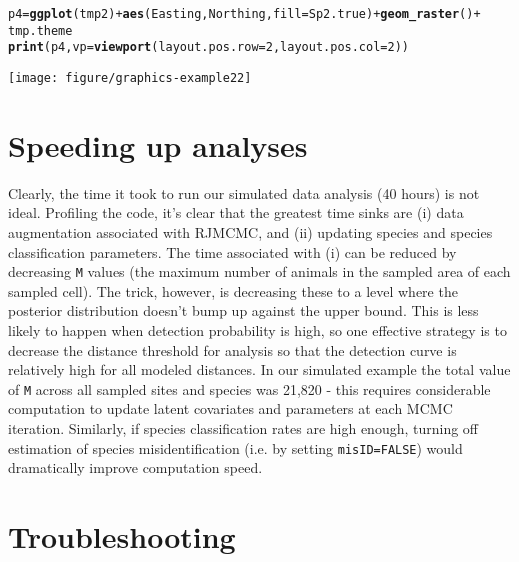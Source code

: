 \documentclass{article}\usepackage{graphicx, color}
\makeatletter
\def\maxwidth{ %
  \ifdim\Gin@nat@width>\linewidth
    \linewidth
  \else
    \Gin@nat@width
  \fi
}
\newcommand{\hlfunctioncall}[1]{\textcolor[rgb]{0.501960784313725,0,0.329411764705882}{\textbf{#1}}}%
\newenvironment{kframe}{%
 \def\at@end@of@kframe{}%
 \ifinner\ifhmode%
  \def\at@end@of@kframe{\end{minipage}}%
  \begin{minipage}{\columnwidth}%
 \fi\fi%
 \def\FrameCommand##1{\hskip\@totalleftmargin \hskip-\fboxsep
 \colorbox{shadecolor}{##1}\hskip-\fboxsep
     \hskip-\linewidth \hskip-\@totalleftmargin \hskip\columnwidth}%
 \MakeFramed {\advance\hsize-\width
   \@totalleftmargin\z@ \linewidth\hsize
   \@setminipage}}%
 {\par\unskip\endMakeFramed%
 \at@end@of@kframe}
\newenvironment{knitrout}{}{} %
\makeatother
\begin{document}
\begin{knitrout}
\begin{kframe}
{\ttfamily\noindent\bfseries\color{errorcolor}{\#\# Error: object 'Sp1.true' not found}}\begin{alltt}
p4 = \hlfunctioncall{ggplot}(tmp2) + \hlfunctioncall{aes}(Easting, Northing, fill = Sp2.true) + \hlfunctioncall{geom_raster}() + 
    tmp.theme
\hlfunctioncall{print}(p4, vp = \hlfunctioncall{viewport}(layout.pos.row = 2, layout.pos.col = 2))
\end{alltt}


{\ttfamily\noindent\bfseries\color{errorcolor}{\#\# Error: object 'Sp2.true' not found}}\end{kframe}

{\centering \texttt{[image: figure/graphics-example22]} 

}



\end{knitrout}



\section{Speeding up analyses}

Clearly, the time it took to run our simulated data analysis (40 hours) is not ideal.  Profiling the code,
it's clear that the greatest time sinks are (i) data augmentation associated with RJMCMC, and (ii) updating species and species classification parameters. The time
associated with (i) can be reduced by decreasing \texttt{M} values (the maximum number of animals in the sampled area of each sampled cell).  The trick, however, is decreasing these to a level where the posterior distribution doesn't bump up against the upper bound.  This is less likely to happen when detection probability is high, so one effective strategy is to decrease the distance threshold for analysis so that the detection curve is relatively high for all modeled distances.  In our simulated example the total value of \texttt{M} across all sampled sites and species was 21,820 - this requires considerable computation to update latent covariates and parameters at each MCMC iteration. Similarly, if species classification rates are high enough, turning off estimation of species misidentification (i.e. by setting \texttt{misID=FALSE}) would dramatically improve computation speed. 

\section{Troubleshooting}
\end{document}
